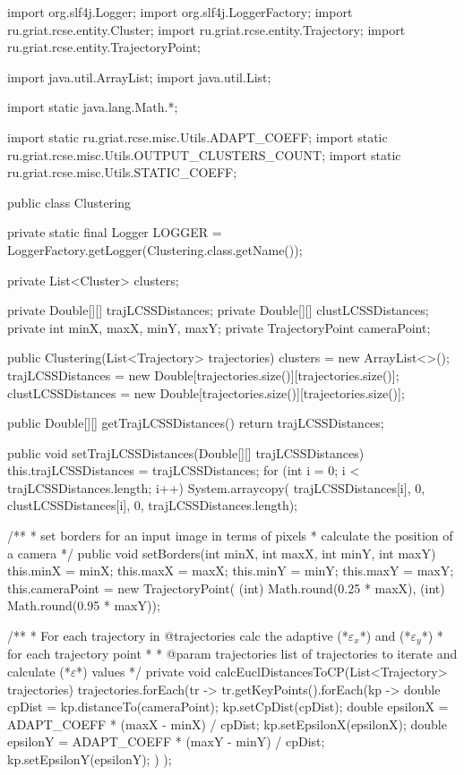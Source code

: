 import org.slf4j.Logger;
import org.slf4j.LoggerFactory;
import ru.griat.rcse.entity.Cluster;
import ru.griat.rcse.entity.Trajectory;
import ru.griat.rcse.entity.TrajectoryPoint;

import java.util.ArrayList;
import java.util.List;

import static java.lang.Math.*;

import static ru.griat.rcse.misc.Utils.ADAPT_COEFF;
import static ru.griat.rcse.misc.Utils.OUTPUT_CLUSTERS_COUNT;
import static ru.griat.rcse.misc.Utils.STATIC_COEFF;

public class Clustering {

    private static final Logger LOGGER = LoggerFactory.getLogger(Clustering.class.getName());

    private List<Cluster> clusters;

    private Double[][] trajLCSSDistances;
    private Double[][] clustLCSSDistances;
    private int minX, maxX, minY, maxY;
    private TrajectoryPoint cameraPoint;

    public Clustering(List<Trajectory> trajectories) {
        clusters = new ArrayList<>();
        trajLCSSDistances = new Double[trajectories.size()][trajectories.size()];
        clustLCSSDistances = new Double[trajectories.size()][trajectories.size()];
    }

    public Double[][] getTrajLCSSDistances() {
        return trajLCSSDistances;
    }

    public void setTrajLCSSDistances(Double[][] trajLCSSDistances) {
        this.trajLCSSDistances = trajLCSSDistances;
        for (int i = 0; i < trajLCSSDistances.length; i++) {
            System.arraycopy(
            		trajLCSSDistances[i], 0, 
            		clustLCSSDistances[i], 0, 
            		trajLCSSDistances.length);
        }
    }

    /**
	* set borders for an input image in terms of pixels
	* calculate the position of a camera
	*/	
    public void setBorders(int minX, int maxX, int minY, int maxY) {
    		this.minX = minX; this.maxX = maxX;
    		this.minY = minY; this.maxY = maxY;
	    	this.cameraPoint = new TrajectoryPoint(
	    			(int) Math.round(0.25 * maxX), 
	    			(int) Math.round(0.95 * maxY));
    }


	/**
	* For each trajectory in @trajectories calc the adaptive (*$\varepsilon_x$*) and (*$\varepsilon_y$*)
	* for each trajectory point
	* 
	* @param trajectories list of trajectories to iterate and calculate (*$\varepsilon$*) values
	*/
	private void calcEuclDistancesToCP(List<Trajectory> trajectories) {
        trajectories.forEach(tr ->
				tr.getKeyPoints().forEach(kp -> {
					double cpDist = kp.distanceTo(cameraPoint);
					kp.setCpDist(cpDist);
					double epsilonX = ADAPT_COEFF * (maxX - minX) / cpDist;
					kp.setEpsilonX(epsilonX);
					double epsilonY = ADAPT_COEFF * (maxY - minY) / cpDist;
					kp.setEpsilonY(epsilonY);
                })
		);
    }

}
